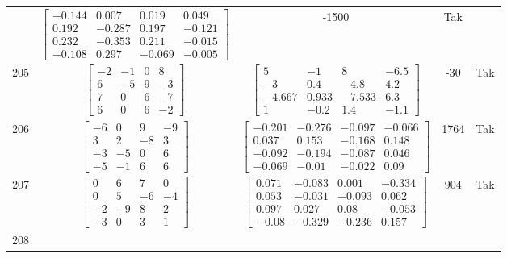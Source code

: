 \documentclass[a4paper,12pt]{article}
\begin{document}
\begin{tabular}{c c c c c}
&
$\begin{bmatrix} -0.144 & 0.007 & 0.019 & 0.049 \\ 0.192 & -0.287 & 0.197 & -0.121 \\ 0.232 & -0.353 & 0.211 & -0.015 \\ -0.108 & 0.297 & -0.069 & -0.005 \end{bmatrix}$
&
-1500
&
Tak
\\
205
&
$\begin{bmatrix} -2 & -1 & 0 & 8 \\ 6 & -5 & 9 & -3 \\ 7 & 0 & 6 & -7 \\ 6 & 0 & 6 & -2 \end{bmatrix}$
&
$\begin{bmatrix} 5 & -1 & 8 & -6.5 \\ -3 & 0.4 & -4.8 & 4.2 \\ -4.667 & 0.933 & -7.533 & 6.3 \\ 1 & -0.2 & 1.4 & -1.1 \end{bmatrix}$
&
-30
&
Tak
\\
206
&
$\begin{bmatrix} -6 & 0 & 9 & -9 \\ 3 & 2 & -8 & 3 \\ -3 & -5 & 0 & 6 \\ -5 & -1 & 6 & 6 \end{bmatrix}$
&
$\begin{bmatrix} -0.201 & -0.276 & -0.097 & -0.066 \\ 0.037 & 0.153 & -0.168 & 0.148 \\ -0.092 & -0.194 & -0.087 & 0.046 \\ -0.069 & -0.01 & -0.022 & 0.09 \end{bmatrix}$
&
1764
&
Tak
\\
207
&
$\begin{bmatrix} 0 & 6 & 7 & 0 \\ 0 & 5 & -6 & -4 \\ -2 & -9 & 8 & 2 \\ -3 & 0 & 3 & 1 \end{bmatrix}$
&
$\begin{bmatrix} 0.071 & -0.083 & 0.001 & -0.334 \\ 0.053 & -0.031 & -0.093 & 0.062 \\ 0.097 & 0.027 & 0.08 & -0.053 \\ -0.08 & -0.329 & -0.236 & 0.157 \end{bmatrix}$
&
904
&
Tak
\\
208

\end{tabular}
\end{document}
